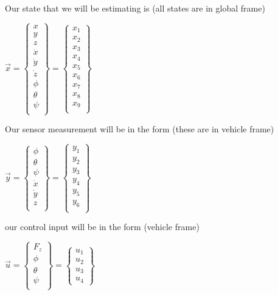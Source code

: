 \documentclass[12pt]{article}
\begin{document}
Our state that we will be estimating is (all states are in global frame)\\
\begin{center}
$
\vec{x} = 
\begin{Bmatrix}
x \\
y \\
z \\
\dot{x} \\
\dot{y} \\
\dot{z} \\
\phi \\
\theta \\
\psi \\
\end{Bmatrix}
=
\begin{Bmatrix}
x_{1} \\
x_{2} \\
x_{3} \\
x_{4} \\
x_{5} \\
x_{6} \\
x_{7} \\
x_{8} \\
x_{9} \\
\end{Bmatrix}
$
\end{center}

Our sensor measurement will be in the form (these are in vehicle frame)
\begin{center}
$
\vec{y} = 
\begin{Bmatrix}
\phi \\
\theta \\
\psi \\
\dot{x} \\
\dot{y} \\
z \\
\end{Bmatrix}
=
\begin{Bmatrix}
y_{1} \\
y_{2} \\
y_{3} \\
y_{4} \\
y_{5} \\
y_{6} \\
\end{Bmatrix}
$
\end{center}

our control input will be in the form (vehicle frame)
\begin{center}
$
\vec{u} = 
\begin{Bmatrix}
F_{z}\\
\phi \\
\theta \\
\psi \\
\end{Bmatrix}
=
\begin{Bmatrix}
u_{1} \\
u_{2} \\
u_{3} \\
u_{4}
\end{Bmatrix}
$
\end{center}
\end{document}
